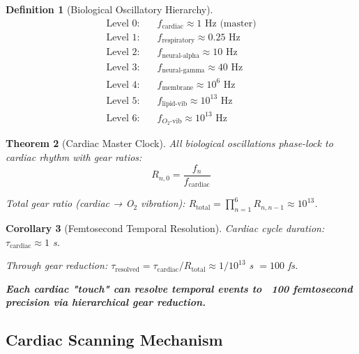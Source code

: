 \documentclass[11pt,a4paper]{article}
\newtheorem{theorem}{Theorem}[section]
\newtheorem{corollary}[theorem]{Corollary}
\theoremstyle{definition}
\newtheorem{definition}[theorem]{Definition}
\theoremstyle{remark}
\begin{document}
\begin{definition}[Biological Oscillatory Hierarchy]
\begin{align}
\text{Level 0}: \quad & f_{\text{cardiac}} \approx 1 \text{ Hz (master)} \\
\text{Level 1}: \quad & f_{\text{respiratory}} \approx 0.25 \text{ Hz} \\
\text{Level 2}: \quad & f_{\text{neural-alpha}} \approx 10 \text{ Hz} \\
\text{Level 3}: \quad & f_{\text{neural-gamma}} \approx 40 \text{ Hz} \\
\text{Level 4}: \quad & f_{\text{membrane}} \approx 10^6 \text{ Hz} \\
\text{Level 5}: \quad & f_{\text{lipid-vib}} \approx 10^{13} \text{ Hz} \\
\text{Level 6}: \quad & f_{O_2\text{-vib}} \approx 10^{13} \text{ Hz}
\end{align}
\end{definition}

\begin{theorem}[Cardiac Master Clock]
All biological oscillations phase-lock to cardiac rhythm with gear ratios:
\begin{equation}
R_{n,0} = \frac{f_n}{f_{\text{cardiac}}}
\end{equation}

Total gear ratio (cardiac → O$_2$ vibration): $R_{\text{total}} = \prod_{n=1}^6 R_{n,n-1} \approx 10^{13}$.
\end{theorem}

\begin{corollary}[Femtosecond Temporal Resolution]
Cardiac cycle duration: $\tau_{\text{cardiac}} \approx 1$ s.

Through gear reduction: $\tau_{\text{resolved}} = \tau_{\text{cardiac}}/R_{\text{total}} \approx 1/10^{13}$ s $= 100$ fs.

\textbf{Each cardiac "touch" can resolve temporal events to ~100 femtosecond precision via hierarchical gear reduction.}
\end{corollary}

\subsection{Cardiac Scanning Mechanism}
\end{document}
